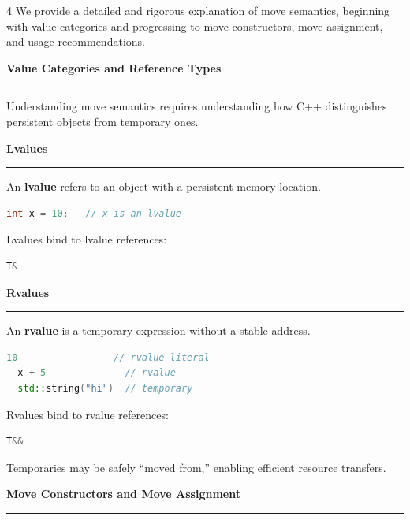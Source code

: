 \documentclass[final]{beamer}
\renewcommand{\section}[1]{%
  \par\vspace{1em}%
  {\noindent\Large\bfseries #1\par}%
  \vspace{0.5em}\hrule\vspace{1em}%
}
\renewcommand{\subsection}[1]{%
  \par\vspace{1em}%
  {\noindent\large\bfseries #1\par}%
  \vspace{0.5em}\hrule\vspace{1em}%
}
\begin{document}
\begin{frame}[t,fragile]
\begin{multicols}{4}
  We provide a detailed and rigorous explanation of move semantics, beginning with value categories and progressing to move constructors, move assignment, and usage recommendations.

  \subsection{Value Categories and Reference Types}

  Understanding move semantics requires understanding how C++ distinguishes persistent objects from temporary ones.

  \subsection{Lvalues}

  An \textbf{lvalue} refers to an object with a persistent memory location.

  \begin{lstlisting}[language=C++]
  int x = 10;   // x is an lvalue
  \end{lstlisting}

  Lvalues bind to lvalue references:

  \begin{lstlisting}[language=C++]
  T&
  \end{lstlisting}

  \subsection{Rvalues}

  An \textbf{rvalue} is a temporary expression without a stable address.

  \begin{lstlisting}[language=C++]
  10                 // rvalue literal
  x + 5              // rvalue
  std::string("hi")  // temporary
  \end{lstlisting}

  Rvalues bind to rvalue references:

  \begin{lstlisting}[language=C++]
  T&&
  \end{lstlisting}
  
  Temporaries may be safely “moved from,” enabling efficient resource transfers.

  \section{Move Constructors and Move Assignment}


\end{multicols}
\end{frame}
\end{document}
